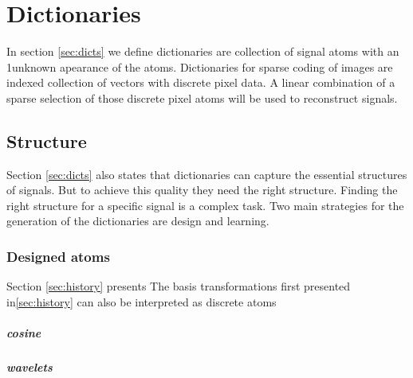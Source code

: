 \chapter{Dictionaries}
In section \ref{sec:dicts} we define dictionaries are
collection of signal atoms with an 1unknown apearance of the atoms. Dictionaries
for sparse coding of images are indexed collection of vectors with discrete
pixel data. A linear combination of a sparse selection of those discrete pixel
atoms will be used to reconstruct signals.

\section{Structure}
Section \ref{sec:dicts} also states that dictionaries can capture the
essential structures of signals. But to achieve this quality they need the right
structure. Finding the right structure for a specific signal is a complex task.
Two main strategies for the generation of the dictionaries are design and
learning.

\subsection{Designed atoms}
Section \ref{sec:history} presents 
The basis transformations first presented in\ref{sec:history} can also
be interpreted as discrete atoms 

\paragraph{cosine}


\paragraph{wavelets}

